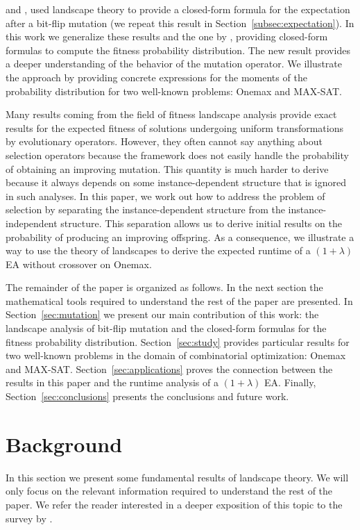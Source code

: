 \documentclass{article}
\begin{document}
\cite{Sutton2011gecco} and \cite{Chicano2011gecco}, used landscape theory to provide a closed-form formula for the expectation after a bit-flip mutation (we repeat this result in Section~\ref{subsec:expectation}). In this work we generalize these results and the one by \cite{Sutton2011foga}, providing closed-form formulas to compute the fitness probability distribution. The new result provides a deeper understanding of the behavior of the mutation operator. We illustrate the approach by providing concrete expressions for the moments of the probability distribution for two well-known problems: Onemax and MAX-SAT. 

Many results coming from the field of fitness landscape analysis provide exact results for the expected fitness of solutions undergoing uniform transformations by evolutionary operators. However, they often cannot say anything about selection operators because the framework does not easily handle the probability of obtaining an improving mutation. This quantity is much harder to derive because it always depends on some instance-dependent structure that is ignored in such analyses. In this paper, we work out how to address the problem of selection by separating the instance-dependent structure from the instance-independent structure. This separation allows us to derive initial results on the probability of producing an improving offspring. As a consequence, we illustrate a way to use the theory of landscapes to derive the expected runtime of a $(1+\lambda)$ EA without crossover on Onemax.

The remainder of the paper is organized as follows. In the next section the mathematical tools required to understand the rest of the paper are presented. In Section~\ref{sec:mutation} we present our main contribution of this work: the landscape analysis of bit-flip mutation and the closed-form formulas for the fitness probability distribution. Section~\ref{sec:study} provides particular results for two well-known problems in the domain of combinatorial optimization: Onemax and MAX-SAT. Section~\ref{sec:applications} proves the connection between the results in this paper and the runtime analysis of a $(1+\lambda)$ EA. Finally, Section~\ref{sec:conclusions} presents the conclusions and future work.

\section{Background}
\label{sec:background}

In this section we present some fundamental results of landscape theory. We will only focus on the relevant information required to understand the rest of the paper. We refer the reader interested in a deeper exposition of this topic to the survey by \cite{Reidys2002}.
\end{document}
